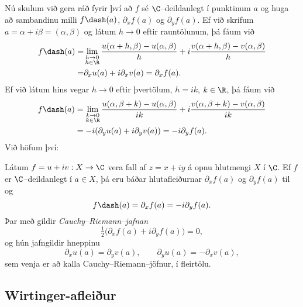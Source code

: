 Nú skulum við gera ráð fyrir því að $f$ sé $\C$--deildanlegt í punktinum
$a$ og huga að sambandinu milli $f\dash(a)$, ${\partial}_xf(a)$ og
${\partial}_yf(a)$. 
Ef við skrifum $a=\alpha+i\beta=(\alpha, \beta)$ og látum $h\to
0$ eftir  rauntölunum, þá fáum við 
\begin{align*}
f\dash(a)=&\lim_{\substack{h\to 0\\ h\in \R}}
\dfrac{u(\alpha+h,\beta)-u(\alpha,\beta)}h+i
\dfrac{v(\alpha+h,\beta)-v(\alpha,\beta)}h\\
=&\partial_xu(a)+i\partial_xv(a)=\partial_xf(a).\nonumber
\end{align*}
Ef við látum hins vegar $h\to 0$ eftir þvertölum, $h=ik$,
$k\in \R$, þá fáum við
\begin{align*}
f\dash(a)&=\lim_{\substack{k\to 0\\ k\in \R}}
\dfrac{u(\alpha,\beta+k)-u(\alpha,\beta)}{ik}+i
\dfrac{v(\alpha,\beta+k)-v(\alpha,\beta)}{ik}\\
&=-i(\partial_yu(a)+i\partial_yv(a))=-i\partial_yf(a).\nonumber
\end{align*}
Við höfum því:  

\begin{se}\label{set4.2.8}  Látum $f=u+iv:X\to \C$ vera fall af $z=x+iy$ á opnu hlutmengi
$X$ í $\C$.  Ef $f$ er $\C$--deildanlegt í $a\in X$, þá eru báðar
hlutafleiðurnar $\partial_xf(a)$ og $\partial_yf(a)$ til og
 \begin{equation*}f\dash(a)=\partial_xf(a)=-i\partial_yf(a).
\label{4.2.7}
 \end{equation*}
Þar með gildir {\it
Cauchy--Riemann--jafnan
}
\begin{equation*}
\tfrac 12\big(\partial_xf(a)+i\partial_yf(a)\big)=0,
\label{4.2.8}
\end{equation*}
og  hún jafngildir hneppinu
\begin{equation*}
\partial_xu(a)=\partial_yv(a), \qquad \partial_yu(a)=-\partial_xv(a),
\label{4.2.9}
\end{equation*}
sem venja er að kalla Cauchy--Riemann--jöfnur, í fleirtölu.
\end{se}


\subsection*{Wirtinger-afleiður}


